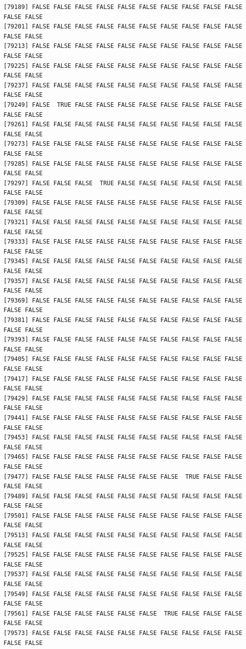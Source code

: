 \documentclass[
  a4paper,
  DIV=11,
  numbers=noendperiod]{scrartcl}
\begin{document}
\begin{verbatim}
[79189] FALSE FALSE FALSE FALSE FALSE FALSE FALSE FALSE FALSE FALSE FALSE FALSE
[79201] FALSE FALSE FALSE FALSE FALSE FALSE FALSE FALSE FALSE FALSE FALSE FALSE
[79213] FALSE FALSE FALSE FALSE FALSE FALSE FALSE FALSE FALSE FALSE FALSE FALSE
[79225] FALSE FALSE FALSE FALSE FALSE FALSE FALSE FALSE FALSE FALSE FALSE FALSE
[79237] FALSE FALSE FALSE FALSE FALSE FALSE FALSE FALSE FALSE FALSE FALSE FALSE
[79249] FALSE  TRUE FALSE FALSE FALSE FALSE FALSE FALSE FALSE FALSE FALSE FALSE
[79261] FALSE FALSE FALSE FALSE FALSE FALSE FALSE FALSE FALSE FALSE FALSE FALSE
[79273] FALSE FALSE FALSE FALSE FALSE FALSE FALSE FALSE FALSE FALSE FALSE FALSE
[79285] FALSE FALSE FALSE FALSE FALSE FALSE FALSE FALSE FALSE FALSE FALSE FALSE
[79297] FALSE FALSE FALSE  TRUE FALSE FALSE FALSE FALSE FALSE FALSE FALSE FALSE
[79309] FALSE FALSE FALSE FALSE FALSE FALSE FALSE FALSE FALSE FALSE FALSE FALSE
[79321] FALSE FALSE FALSE FALSE FALSE FALSE FALSE FALSE FALSE FALSE FALSE FALSE
[79333] FALSE FALSE FALSE FALSE FALSE FALSE FALSE FALSE FALSE FALSE FALSE FALSE
[79345] FALSE FALSE FALSE FALSE FALSE FALSE FALSE FALSE FALSE FALSE FALSE FALSE
[79357] FALSE FALSE FALSE FALSE FALSE FALSE FALSE FALSE FALSE FALSE FALSE FALSE
[79369] FALSE FALSE FALSE FALSE FALSE FALSE FALSE FALSE FALSE FALSE FALSE FALSE
[79381] FALSE FALSE FALSE FALSE FALSE FALSE FALSE FALSE FALSE FALSE FALSE FALSE
[79393] FALSE FALSE FALSE FALSE FALSE FALSE FALSE FALSE FALSE FALSE FALSE FALSE
[79405] FALSE FALSE FALSE FALSE FALSE FALSE FALSE FALSE FALSE FALSE FALSE FALSE
[79417] FALSE FALSE FALSE FALSE FALSE FALSE FALSE FALSE FALSE FALSE FALSE FALSE
[79429] FALSE FALSE FALSE FALSE FALSE FALSE FALSE FALSE FALSE FALSE FALSE FALSE
[79441] FALSE FALSE FALSE FALSE FALSE FALSE FALSE FALSE FALSE FALSE FALSE FALSE
[79453] FALSE FALSE FALSE FALSE FALSE FALSE FALSE FALSE FALSE FALSE FALSE FALSE
[79465] FALSE FALSE FALSE FALSE FALSE FALSE FALSE FALSE FALSE FALSE FALSE FALSE
[79477] FALSE FALSE FALSE FALSE FALSE FALSE FALSE  TRUE FALSE FALSE FALSE FALSE
[79489] FALSE FALSE FALSE FALSE FALSE FALSE FALSE FALSE FALSE FALSE FALSE FALSE
[79501] FALSE FALSE FALSE FALSE FALSE FALSE FALSE FALSE FALSE FALSE FALSE FALSE
[79513] FALSE FALSE FALSE FALSE FALSE FALSE FALSE FALSE FALSE FALSE FALSE FALSE
[79525] FALSE FALSE FALSE FALSE FALSE FALSE FALSE FALSE FALSE FALSE FALSE FALSE
[79537] FALSE FALSE FALSE FALSE FALSE FALSE FALSE FALSE FALSE FALSE FALSE FALSE
[79549] FALSE FALSE FALSE FALSE FALSE FALSE FALSE FALSE FALSE FALSE FALSE FALSE
[79561] FALSE FALSE FALSE FALSE FALSE FALSE  TRUE FALSE FALSE FALSE FALSE FALSE
[79573] FALSE FALSE FALSE FALSE FALSE FALSE FALSE FALSE FALSE FALSE FALSE FALSE

\end{verbatim}
\end{document}
